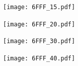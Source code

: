 \documentclass[aspectratio=169,xcolor=dvipsnames,t]{beamer}
\begin{document}
\begin{frame}
      \vspace{1cm}
      \begin{figure}
            \centering
            \begin{subfigure}[b]{0.49\linewidth}
                  \texttt{[image: 6FFF\_15.pdf]}
            \end{subfigure}
            \begin{subfigure}[b]{0.49\linewidth}
                  \texttt{[image: 6FFF\_20.pdf]}
            \end{subfigure}
      \end{figure}
\end{frame}

\begin{frame}
      \vspace{1cm}
      \begin{figure}
            \centering
            \begin{subfigure}[b]{0.49\linewidth}
                  \texttt{[image: 6FFF\_30.pdf]}
            \end{subfigure}
            \begin{subfigure}[b]{0.49\linewidth}
                  \texttt{[image: 6FFF\_40.pdf]}
            \end{subfigure}
      \end{figure}
\end{frame}


\End
\end{document}
